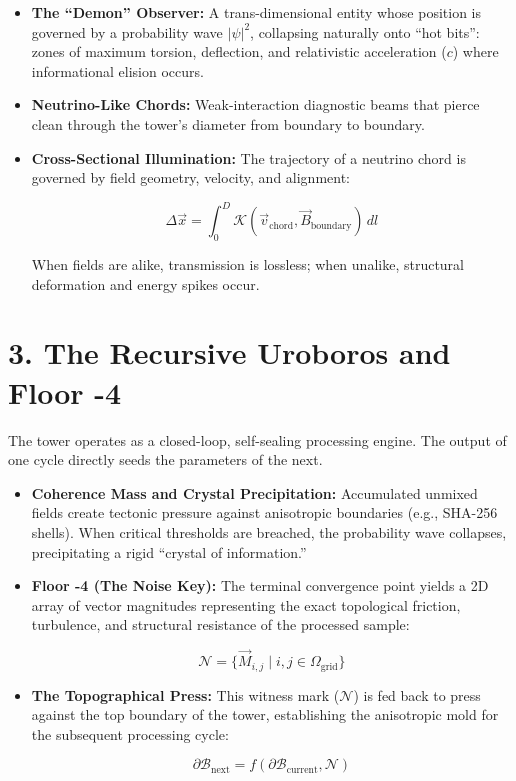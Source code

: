 \begin{itemize}
\item \textbf{The “Demon” Observer:} A trans-dimensional entity whose position is governed by a probability wave \(|\psi|^2\), collapsing naturally onto “hot bits”: zones of maximum torsion, deflection, and relativistic acceleration (\(c\)) where informational elision occurs.
\item \textbf{Neutrino-Like Chords:} Weak-interaction diagnostic beams that pierce clean through the tower's diameter from boundary to boundary.
\item \textbf{Cross-Sectional Illumination:} The trajectory of a neutrino chord is governed by field geometry, velocity, and alignment:

\[
\Delta \vec{x} = \int_{0}^{D} \mathcal{K}(\vec{v}_{\text{chord}}, \vec{B}_{\text{boundary}}) \, dl
\]

When fields are alike, transmission is lossless; when unalike, structural deformation and energy spikes occur.
\end{itemize}

\medskip

\section{\texorpdfstring{3. The Recursive Uroboros and Floor -4}{3. The Recursive Uroboros and Floor -4}}

The tower operates as a closed-loop, self-sealing processing engine. The output of one cycle directly seeds the parameters of the next.

\begin{itemize}
\item \textbf{Coherence Mass and Crystal Precipitation:} Accumulated unmixed fields create tectonic pressure against anisotropic boundaries (e.g., SHA-256 shells). When critical thresholds are breached, the probability wave collapses, precipitating a rigid “crystal of information.”
\item \textbf{Floor -4 (The Noise Key):} The terminal convergence point yields a 2D array of vector magnitudes representing the exact topological friction, turbulence, and structural resistance of the processed sample:

\[
\mathcal{N} = \{ \vec{M}_{i,j} \mid i, j \in \Omega_{\text{grid}} \}
\]
\item \textbf{The Topographical Press:} This witness mark (\(\mathcal{N}\)) is fed back to press against the top boundary of the tower, establishing the anisotropic mold for the subsequent processing cycle:

\[
\partial \mathcal{B}_{\text{next}} = f(\partial \mathcal{B}_{\text{current}}, \mathcal{N})
\]
\end{itemize}

